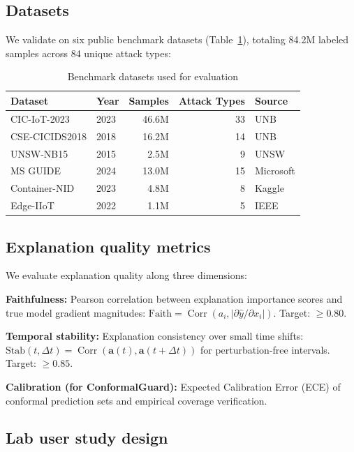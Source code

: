 \documentclass[preprint,review,12pt]{elsarticle}
\DeclareMathOperator{\Corr}{Corr}
\begin{document}
\subsection{Datasets}

We validate on six public benchmark datasets (Table~\ref{tab:datasets}), totaling 84.2M labeled samples across 84 unique attack types:

\begin{table}[!t]
\centering
\caption{Benchmark datasets used for evaluation}
\label{tab:datasets}
\begin{tabular}{@{}llrrl@{}}
\toprule
\textbf{Dataset} & \textbf{Year} & \textbf{Samples} & \textbf{Attack Types} & \textbf{Source} \\
\midrule
CIC-IoT-2023 & 2023 & 46.6M & 33 & UNB \\
CSE-CICIDS2018 & 2018 & 16.2M & 14 & UNB \\
UNSW-NB15 & 2015 & 2.5M & 9 & UNSW \\
MS GUIDE & 2024 & 13.0M & 15 & Microsoft \\
Container-NID & 2023 & 4.8M & 8 & Kaggle \\
Edge-IIoT & 2022 & 1.1M & 5 & IEEE \\
\bottomrule
\end{tabular}
\end{table}

\subsection{Explanation quality metrics}

We evaluate explanation quality along three dimensions:

\textbf{Faithfulness:} Pearson correlation between explanation importance scores and true model gradient magnitudes: $\text{Faith} = \Corr(a_i, |\partial \hat{y} / \partial x_i|)$. Target: $\geq 0.80$.

\textbf{Temporal stability:} Explanation consistency over small time shifts: $\text{Stab}(t, \Delta t) = \Corr(\mathbf{a}(t), \mathbf{a}(t{+}\Delta t))$ for perturbation-free intervals. Target: $\geq 0.85$.

\textbf{Calibration (for ConformalGuard):} Expected Calibration Error (ECE) of conformal prediction sets and empirical coverage verification.

\subsection{Lab user study design}
\end{document}
